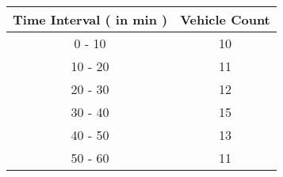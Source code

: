 \begin{table}
\centering
\begin{tabular}{|c|c|}
\hline
\textbf{Time Interval ( in min )} & \textbf{Vehicle Count} \\
\hline
0 - 10 & 10 \\
\hline
10 - 20 & 11 \\
\hline
20 - 30 & 12 \\
\hline
30 - 40 & 15 \\
\hline
40 - 50 & 13 \\
\hline
50 - 60 & 11 \\
\hline
\end{tabular}
\label{tab: Q_64}
\end{table}
